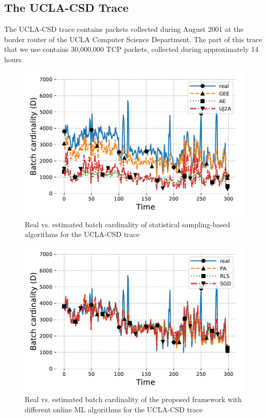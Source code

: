 	\subsection{The UCLA-CSD Trace}

		The UCLA-CSD trace \cite{uclacsd} contains packets collected during August 2001 at the border router of the UCLA Computer Science Department. The part of this trace that we use contains 30,000,000 TCP packets, collected during approximately 14 hours.
			
		\begin{figure}[!tb]
			\centering
			\includegraphics[width=.95\linewidth]{img/ucla-csd_sampling_paper.pdf}
			\caption{Real vs. estimated batch cardinality of statistical sampling-based algorithms for the UCLA-CSD trace}
			\label{fig:ucla-csd_statistical}
		\end{figure}
		
		\begin{figure}[!tb]
			\centering
			\includegraphics[width=.95\linewidth]{img/ucla-csd_online_ml_paper.pdf}
			\caption{Real vs. estimated batch cardinality of the proposed framework with different online ML algorithms for the UCLA-CSD trace}
			\label{fig:ucla-csd_online_ml}
		\end{figure}


